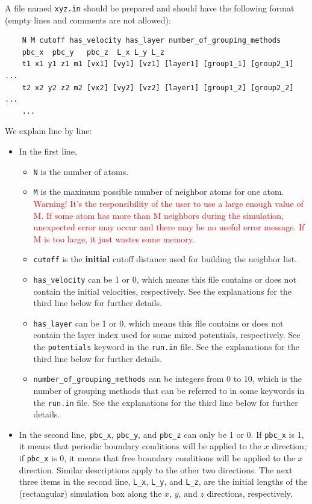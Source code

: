 \documentclass[12pt,a4paper]{report}
\begin{document}
A file named \verb"xyz.in" should be prepared and should have the following format (empty lines and comments are not allowed):
\begin{verbatim}
    N M cutoff has_velocity has_layer number_of_grouping_methods
    pbc_x  pbc_y   pbc_z  L_x L_y L_z
    t1 x1 y1 z1 m1 [vx1] [vy1] [vz1] [layer1] [group1_1] [group2_1] ...
    t2 x2 y2 z2 m2 [vx2] [vy2] [vz2] [layer1] [group1_2] [group2_2] ...
    ...
\end{verbatim}
We explain line by line:
\begin{itemize}
\item In the first line, 
\begin{itemize}
\item \verb"N" is the number of atoms.
\item \verb"M" is the maximum possible number of neighbor atoms for one atom. \textcolor{red}{Warning! It's the responsibility of the user to use a large enough value of M. If some atom has more than M neighbors during the simulation, unexpected error may occur and there may be no useful error message. If M is too large, it just wastes some memory. } 
\item \verb"cutoff" is the \textbf{initial} cutoff distance used for building the neighbor list. 
\item \verb"has_velocity" can be 1 or 0, which means this file contains or does not contain the initial velocities, respectively.  See the explanations for the third line below for further details.
\item \verb"has_layer" can be 1 or 0, which means this file contains or does not contain the layer index used for some mixed potentials, respectively. See the \verb"potentials" keyword in the \verb"run.in" file.  See the explanations for the third line below for further details.
\item \verb"number_of_grouping_methods" can be integers from 0 to 10, which is the number of grouping methods that can be referred to in some keywords in the \verb"run.in" file.  See the explanations for the third line below for further details.
\end{itemize}
\item In the second line, \verb"pbc_x",  \verb"pbc_y", and \verb"pbc_z" can only be 1 or 0. If \verb"pbc_x" is 1, it means that periodic boundary conditions will be applied to the $x$ direction; if \verb"pbc_x" is 0, it means that free boundary conditions will be applied to the $x$ direction. Similar descriptions apply to the other two directions. The next three items in the second line, \verb"L_x", \verb"L_y", and \verb"L_z", are the initial lengths of the (rectangular) simulation box along the $x$, $y$, and $z$ directions, respectively.

\end{itemize}
\end{document}
